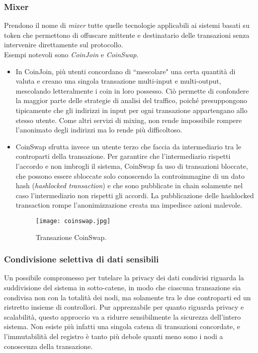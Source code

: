         \subsubsection{Mixer}
            Prendono il nome di \emph{mixer} tutte quelle tecnologie applicabili ai sistemi basati su token che permettono di offuscare mittente e destinatario delle transazioni senza intervenire direttamente sul protocollo. \\
            Esempi notevoli sono \emph{CoinJoin} e \emph{CoinSwap}. \\
            \begin{itemize}
                \item In CoinJoin, più utenti concordano di ``mescolare" una certa quantità di valuta e creano una singola transazione multi-input e multi-output, mescolando letteralmente i coin in loro possesso. Ciò permette di confondere la maggior parte delle strategie di analisi del traffico, poiché presuppongono tipicamente che gli indirizzi in input per ogni transazione appartengano allo stesso utente. Come altri servizi di mixing, non rende impossibile rompere l'anonimato degli indirizzi ma lo rende più difficoltoso.
                \item CoinSwap sfrutta invece un utente terzo che faccia da intermediario tra le controparti della transazione. Per garantire che l'intermediario rispetti l'accordo e non imbrogli il sistema, CoinSwap fa uso di transazioni bloccate, che possono essere sbloccate solo conoscendo la controimmagine di un dato hash (\emph{hashlocked transaction}) e che sono pubblicate in chain solamente nel caso l'intermediario non rispetti gli accordi. La pubblicazione delle hashlocked transaction rompe l'anonimizzazione creata ma impedisce azioni malevole.
                \begin{figure}
                    \centering
                    \texttt{[image: coinswap.jpg]}
                    \caption[Transazione CoinSwap]{Transazione CoinSwap.}
                    \label{fig:coinswap}
                \end{figure}
            \end{itemize}
        
        \subsubsection{Condivisione selettiva di dati sensibili}
            Un possibile compromesso per tutelare la privacy dei dati condivisi riguarda la suddivisione del sistema in sotto-catene, in modo che ciascuna transazione sia condivisa non con la totalità dei nodi, ma solamente tra le due controparti ed un ristretto insieme di controllori. Pur apprezzabile per quanto riguarda privacy e scalabilità, questo approccio va a ridurre sensibilmente la sicurezza dell'intero sistema. Non esiste più infatti una singola catena di transazioni concordate, e l'immutabilità del registro è tanto più debole quanti meno sono i nodi a conoscenza della transazione.
            
